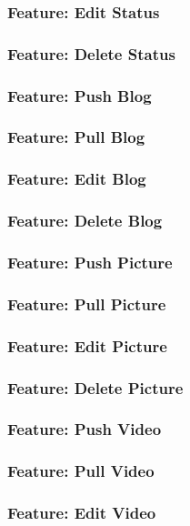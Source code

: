 \documentclass[12pt]{article}
\begin{document}
\subsubsection{Feature: Edit Status}
\subsubsection{Feature: Delete Status}

\subsubsection{Feature: Push Blog}
\subsubsection{Feature: Pull Blog}
\subsubsection{Feature: Edit Blog}
\subsubsection{Feature: Delete Blog}

\subsubsection{Feature: Push Picture}
\subsubsection{Feature: Pull Picture}
\subsubsection{Feature: Edit Picture}
\subsubsection{Feature: Delete Picture}

\subsubsection{Feature: Push Video}
\subsubsection{Feature: Pull Video}
\subsubsection{Feature: Edit Video}
\end{document}
